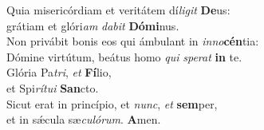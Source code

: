 \evenverse Quia misericórdiam et veritátem dí\textit{li}\textit{git} \textbf{De}us:~\*\\
\evenverse grátiam et glóri\textit{am} \textit{da}\textit{bit} \textbf{Dó}\textbf{mi}nus.\\
\oddverse Non privábit bonis eos qui ámbulant in \textit{in}\textit{no}\textbf{cén}tia:~\*\\
\oddverse Dómine virtútum, beátus homo \textit{qui} \textit{spe}\textit{rat} \textbf{in} te.\\
\evenverse Glória Pa\textit{tri}, \textit{et} \textbf{Fí}lio,~\*\\
\evenverse et Spi\textit{rí}\textit{tu}\textit{i} \textbf{San}cto.\\
\oddverse Sicut erat in princípio, et \textit{nunc}, \textit{et} \textbf{sem}per,~\*\\
\oddverse et in sǽcula sæ\textit{cu}\textit{ló}\textit{rum}. \textbf{A}men.\\
